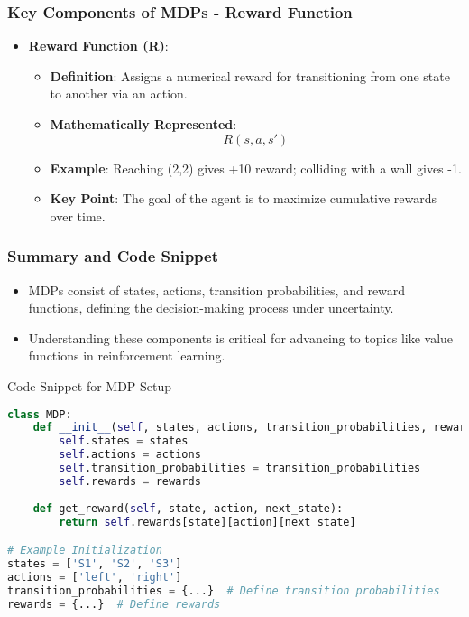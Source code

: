 \documentclass[aspectratio=169]{beamer}
\begin{document}
\begin{frame}
  \frametitle{Key Components of MDPs - Reward Function}
  \begin{itemize}
    \item \textbf{Reward Function (R)}:
      \begin{itemize}
        \item \textbf{Definition}: Assigns a numerical reward for transitioning from one state to another via an action.
        \item \textbf{Mathematically Represented}:
        \begin{equation}
        R(s, a, s')
        \end{equation}
        \item \textbf{Example}: Reaching (2,2) gives +10 reward; colliding with a wall gives -1.
        \item \textbf{Key Point}: The goal of the agent is to maximize cumulative rewards over time.
      \end{itemize}
  \end{itemize}
\end{frame}

\begin{frame}
  \frametitle{Summary and Code Snippet}
  \begin{itemize}
    \item MDPs consist of states, actions, transition probabilities, and reward functions, defining the decision-making process under uncertainty.
    \item Understanding these components is critical for advancing to topics like value functions in reinforcement learning.
  \end{itemize}

  \begin{block}{Code Snippet for MDP Setup}
  \begin{lstlisting}[language=Python]
class MDP:
    def __init__(self, states, actions, transition_probabilities, rewards):
        self.states = states
        self.actions = actions
        self.transition_probabilities = transition_probabilities
        self.rewards = rewards
        
    def get_reward(self, state, action, next_state):
        return self.rewards[state][action][next_state]

# Example Initialization
states = ['S1', 'S2', 'S3']
actions = ['left', 'right']
transition_probabilities = {...}  # Define transition probabilities
rewards = {...}  # Define rewards
  \end{lstlisting}
  \end{block}
\end{frame}
\end{document}
